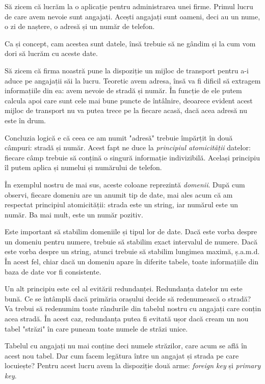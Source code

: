 Să zicem că lucrăm la o aplicație pentru administrarea unei firme. Primul
lucru de care avem nevoie sunt angajați. Acești angajați sunt oameni, deci
au un nume, o zi de naștere, o adresă și un număr de telefon.

Ca și concept, cam acestea sunt datele, însă trebuie să ne gândim și la cum
vom dori să lucrăm cu aceste date.

Să zicem că firma noastră pune la dispoziție un mijloc de transport pentru
a-i aduce pe angajații săi la lucru. Teoretic avem adresa, însă va fi dificil
să extragem informațiile din ea: avem nevoie de stradă și număr. În funcție de
ele putem calcula apoi care sunt cele mai bune puncte de întâlnire, deoarece
evident acest mijloc de transport nu va putea trece pe la fiecare acasă, dacă
acea adresă nu este în drum.

Concluzia logică e că ceea ce am numit "adresă" trebuie împărțit în două câmpuri:
stradă și număr. Acest fapt ne duce la \textsl{principiul atomicității}
datelor: fiecare
câmp trebuie să conțină o singură informație indivizibilă. Același principiu îl
putem aplica și numelui și numărului de telefon.

În exemplul nostru de mai sus, aceste coloane reprezintă \textsl{domenii}. După
cum observi, fiecare domeniu are un anumit tip de date, mai ales acum că am
respectat principiul atomicității: strada este un string, iar numărul este un
număr. Ba mai mult, este un număr pozitiv.

Este important să stabilim domeniile și tipul lor de date. Dacă este vorba despre
un domeniu pentru numere, trebuie să stabilim exact intervalul de numere. Dacă
este vorba despre un string, atunci trebuie să stabilim lungimea maximă, ș.a.m.d.
În acest fel, chiar dacă un domeniu apare în diferite tabele, toate informațiile
din baza de date vor fi consistente.

Un alt principiu este cel al evitării redundanței. Redundanța datelor nu este
bună. Ce se întâmplă dacă primăria orașului decide să redenumească o stradă?
Va trebui să redenumim toate rândurile din tabelul nostru cu angajați care
conțin acea stradă. În acest caz, redundanța putea fi evitată ușor dacă
cream un nou tabel "străzi" în care puneam toate numele de străzi unice.

Tabelul cu angajați nu mai conține deci numele străzilor, care acum se află
în acest nou tabel. Dar cum facem legătura între un angajat și strada pe care
locuiește? Pentru acest lucru avem la dispoziție două arme: \textsl{foreign key}
și \textsl{primary key}.

